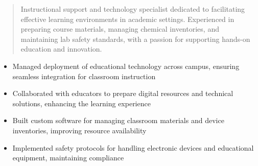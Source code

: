 



\makecvheader

\begin{quote}
  \noindent
  Instructional support and technology specialist dedicated to facilitating effective learning environments in academic settings. Experienced in preparing course materials, managing chemical inventories, and maintaining lab safety standards, with a passion for supporting hands-on education and innovation.
\end{quote}

\par\smallskip
\noindent
\begin{minipage}{20cm}
  \begin{minipage}{9.75cm}
    \begin{itemize}
      \item Managed deployment of educational technology across campus, ensuring seamless integration for classroom instruction
      \item Collaborated with educators to prepare digital resources and technical solutions, enhancing the learning experience
    \end{itemize}
  \end{minipage}
  \hfill
  \begin{minipage}{9.75cm}
    \begin{itemize}
      \item Built custom software for managing classroom materials and device inventories, improving resource availability
      \item Implemented safety protocols for handling electronic devices and educational equipment, maintaining compliance
    \end{itemize}
  \end{minipage}
\end{minipage}
\par\smallskip
\divider

